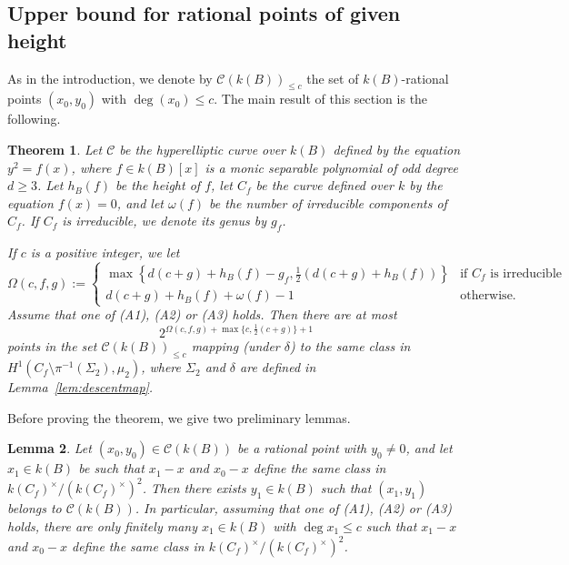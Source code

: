 \documentclass[11pt]{article}
\theoremstyle{plain}
\newtheorem{theorem}{Theorem}[section]
\newtheorem{lemma}[theorem]{Lemma}
\theoremstyle{definition}
\begin{document}

\subsection{Upper bound for rational points of given height}


As in the introduction, we denote by $\mathcal{C}(k(B))_{\leq c}$ the set of $k(B)$-rational points $(x_0,y_0)$ with $\deg(x_0)\leq c$. The main result of this section is the following.

\begin{theorem}
\label{thm:nbratpoint}
Let $\mathcal{C}$ be the hyperelliptic curve over $k(B)$ defined by the equation $y^2=f(x)$, where $f \in k(B)[x]$ is a monic separable polynomial of odd degree $d\geq 3$. Let $h_B(f)$ be the height of $f$, let $C_f$ be the curve defined over $k$ by the equation $f(x)=0$, and let $\omega(f)$ be the number of irreducible components of $C_f$. If $C_f$ is irreducible, we denote its genus by $g_f$.

If $c$ is a positive integer, we let
$$
\Omega(c,f,g) :=
\begin{cases}
 \max\left\{d(c+g)+h_B(f)-g_f, \frac{1}{2}(d(c+g)+h_B(f))\right\} & \text{if $C_f$ is irreducible} \\
 d(c+g)+h_B(f) + \omega(f) -1 & \text{otherwise.}
\end{cases}
$$
Assume that one of (A1), (A2) or (A3) holds. Then there are at most
$$
2^{\Omega(c,f,g) + \max\{c, \frac{1}{2}(c+g)\} +1}
$$
points in the set $\mathcal{C}(k(B))_{\leq c}$ mapping (under $\delta$) to the same class in $H^1(C_f\setminus \pi^{-1}(\Sigma_2),\mu_2)$, where $\Sigma_2$ and $\delta$ are defined in Lemma~\ref{lem:descentmap}.
\end{theorem}


Before proving the theorem, we give two preliminary lemmas.

\begin{lemma}
\label{x1lem}
Let $(x_0,y_0) \in \mathcal{C}(k(B))$ be a rational point with $y_0\neq 0$,
and let $x_1\in k(B)$ be such that $x_1-x$ and $x_0-x$ define the same class in $k(C_f)^\times/(k(C_f)^\times)^2$. Then there exists $y_1\in k(B)$ such that $(x_1,y_1)$ belongs to $\mathcal{C}(k(B))$. In particular, assuming that one of (A1), (A2) or (A3) holds, there are only finitely many $x_1\in k(B)$ with $\deg x_1 \leq c$ such that $x_1-x$ and $x_0-x$ define the same class in $k(C_f)^\times/(k(C_f)^\times)^2$.
\end{lemma}
\end{document}
